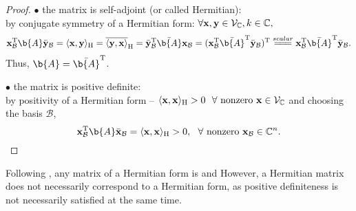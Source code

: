 \begin{theorem}
\begin{proof}
\noindent $\bullet$ the matrix is self-adjoint (or called Hermitian):\\
by conjugate symmetry of a Hermitian form: $\forall \mathbf{x},\mathbf{y} \in \mathcal{V}_{\mathbb{C}}, k \in \mathbb{C},$
$$\x_{\mathcal{B}}^\T \b{A} \bar{\y}_{\mathcal{B}} 
= \langle \x, \y \rangle_\text{H} 
= \overline{\langle \y,\x \rangle}_\text{H}
= \bar{\y}_{\mathcal{B}}^\T \bar{\b{A}} \x_{\mathcal{B}}
= (\x_{\mathcal{B}}^\T \bar{\b{A}}^\T \bar{\y}_{\mathcal{B}})^{\T}
\overset{scalar}{=\mathrel{\mkern-3mu}=\mathrel{\mkern-3mu}=} \x_{\mathcal{B}}^\T \bar{\b{A}}^\T \bar{\y}_{\mathcal{B}}.$$
Thus, $\b{A} = \bar{\b{A}}^\T$.

\noindent $\bullet$ the matrix is positive definite: \\
by positivity of a Hermitian form -- $\langle \mathbf{x}, \mathbf{x} \rangle_\text{H} > 0 ~\ \forall \textnormal{ nonzero } \mathbf{x} \in \mathcal{V}_{\mathbb{C}} $ and choosing the basis $\mathcal{B}$,
$$ \x_{\mathcal{B}}^\T \b{A} \bar{\x}_{\mathcal{B}} = \langle \x, \x \rangle_\text{H} > 0, ~\ \forall \textnormal{ nonzero } \x_{\mathcal{B}} \in \C^n .$$
\end{proof}
\end{theorem}


\begin{remark}
Following , any matrix of a Hermitian form is
and
%
However, a Hermitian matrix does not necessarily correspond to a Hermitian form, as positive definiteness is not necessarily satisfied at the same time.
\end{remark}



